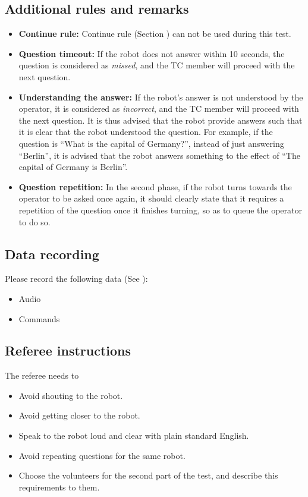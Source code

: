 \subsection{Additional rules and remarks}

\begin{itemize}
\item \textbf{Continue rule:} Continue rule (Section ) can not be used during this test.
\item \textbf{Question timeout:} If the robot does not answer within 10 seconds, the question is considered as \textit{missed}, and the TC member will proceed with the next question.
\item \textbf{Understanding the answer:} If the robot's answer is not understood by the operator, it is considered as \textit{incorrect}, and the TC member will proceed with the next question. It is thus advised that the robot provide answers such that it is clear that the robot understood the question. For example, if the question is ``What is the capital of Germany?'', instead of just answering ``Berlin'', it is advised that the robot answers something to the effect of ``The capital of Germany is Berlin''.
\item \textbf{Question repetition:} In the second phase, if the robot turns towards the operator to be asked once again, it should clearly state that it requires a repetition of the question once it finishes turning, so as to queue the operator to do so.
\end{itemize}

\subsection{Data recording}
  Please record the following data (See ):
  \begin{itemize}
   \item Audio
   \item Commands
  \end{itemize}

\subsection{Referee instructions}

The referee needs to
\begin{itemize}
\item Avoid shouting to the robot.
\item Avoid getting closer to the robot.
\item Speak to the robot loud and clear with plain standard English.
\item Avoid repeating questions for the same robot.
\item Choose the volunteers for the second part of the test, and describe this requirements to them.
\end{itemize}

